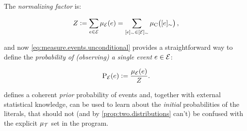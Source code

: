 \documentclass[a4paper]{article}
\newcommand{\at}[1]{\ensuremath{\!\del{#1}}}        %
\newcommand{\cla}[1]{\ensuremath{{\cal #1}}}        %
\newcommand{\TCHOICEset}{\ensuremath{\cla{T}}}
\newcommand{\EVENTSset}{\ensuremath{\cla{E}}}
\newcommand{\prfunc}{\ensuremath{\mathrm{P}}}
\newcommand{\prd}[1]{\ensuremath{\prfunc_{#1}}}
\newcommand{\prE}{\prd{\EVENTSset}}
\newcommand{\pwT}{\ensuremath{\mu_{\TCHOICEset}}}
\newcommand{\pwC}{\ensuremath{\mu_{\textrm{C}}}}
\newcommand{\pwc}[1]{\ensuremath{\pwC\at{#1}}}
\newcommand{\pwE}{\ensuremath{\mu_{\EVENTSset}}}
\newcommand{\pwe}[1]{\ensuremath{\pwE\at{#1}}}
\newcommand{\class}[1]{\ensuremath{[{#1}]_{\sim}}}
\begin{document}
The \emph{normalizing factor} is:

\begin{equation}
    Z :=
    \sum_{e \in \EVENTSset} \pwe{e} =
    \sum_{\class{e} \in \class{\EVENTSset}} \pwc{\class{e}},\label{eq:normalizing.factor}
\end{equation}

and now \cref{eq:measure.events.unconditional} provides a
straightforward way to define the \emph{probability of (observing) a
  single event $e \in \EVENTSset$}:

\begin{equation}
    \prE\at{e} := \frac{\pwe{e}}{Z}.\label{eq:probability.event}
\end{equation}

 defines a coherent \emph{prior}
probability of events and, together with external statistical
knowledge, can be used to learn about the \emph{initial} probabilities
of the literals, that should not (and by \cref{prop:two.distributions}
can't) be confused with the explicit \(\pwT\) set in the program.
\end{document}
